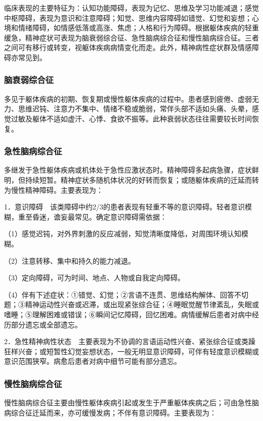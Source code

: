 临床表现的主要特征为：认知功能障碍，表现为记忆、思维及学习功能减退；感觉中枢障碍，表现为意识和注意障碍；知觉、思维内容障碍如错觉、幻觉和妄想；心境和情绪障碍，如情感低落或高涨、焦虑；人格和行为障碍。根据躯体疾病的轻重缓急，精神症状可表现为脑衰弱综合征、急性脑病综合征和慢性脑病综合征。三者之间可有移行或转变，视躯体疾病病情变化而走。此外，精神病性症状群及情感障碍亦常见到。

\subsubsection{脑衰弱综合征}

多见于躯体疾病的初期、恢复期或慢性躯体疾病的过程中。患者感到疲倦、虚弱无力、思维迟钝、注意力不集中、情绪不稳或脆弱，常伴头部不适如头痛、头晕，感觉过敏及躯体不适如虚汗、心悸、食欲不振等。此种衰弱状态往往需要较长时间恢复。

\subsubsection{急性脑病综合征}

多继发于急性躯体疾病或机体处于急性应激状态时。精神障碍多起病急骤，症状鲜明，但持续短暂。精神症状多随机体状况的好转而恢复；或随躯体疾病的迁延而转为慢性精神障碍。主要表现为：

1．意识障碍　该类障碍中约2/3的患者表现有轻重不等的意识障碍。轻者意识模糊，重至昏迷，谵妄最常见。确定意识障碍需依据：

（1）感觉迟钝，对外界刺激的反应减弱，知觉清晰度降低，对周围环境认知模糊。

（2）注意转移、集中和持久的能力减退。

（3）定向障碍，可为时间、地点、人物或自我定向障碍。

（4）伴有下述症状：①错觉、幻觉；②言语不连贯、思维结构解体、回答不切题；③精神运动性兴奋或迟滞，或出现紧张综合征；④睡眠觉醒节律紊乱，失眠或嗜睡；⑤理解困难或错误；⑥瞬间记忆障碍，回忆困难。病情缓解后患者对病中经历部分遗忘或全部遗忘。

2．急性精神病性状态　主要表现为不协调的言语运动性兴奋、紧张综合征或类躁狂样兴奋；或短暂性幻觉妄想状态，一般无明显意识障碍，可伴有轻度意识模糊或意识范围狭窄。病愈后患者对病中细节可能有部分遗忘。

\subsubsection{慢性脑病综合征}

慢性脑病综合征主要由慢性躯体疾病引起或发生于严重躯体疾病之后；可由急性脑病综合征迁延而来，亦可缓慢发病；不伴有意识障碍。主要表现为：

